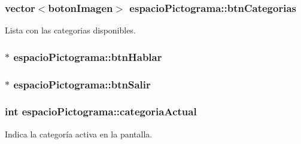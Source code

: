 \subsubsection[{btn\+Categorias}]{\setlength{\rightskip}{0pt plus 5cm}vector$<${\bf boton\+Imagen}$>$ espacio\+Pictograma\+::btn\+Categorias\hspace{0.3cm}{\ttfamily [private]}}\label{classespacio_pictograma_a1bee74237dc5c39e48be1f6773ca854d}


Lista con las categorias disponibles. 

\hypertarget{classespacio_pictograma_a739c7db68be68b07c10fe93b44a5a4d1}{}
\subsubsection[{btn\+Hablar}]{$\ast$ espacio\+Pictograma\+::btn\+Hablar\hspace{0.3cm}{\ttfamily [private]}}\label{classespacio_pictograma_a739c7db68be68b07c10fe93b44a5a4d1}
\hypertarget{classespacio_pictograma_ade5373849fab0cb55bc87bc4293e8c04}{}
\subsubsection[{btn\+Salir}]{$\ast$ espacio\+Pictograma\+::btn\+Salir\hspace{0.3cm}{\ttfamily [private]}}\label{classespacio_pictograma_ade5373849fab0cb55bc87bc4293e8c04}
\hypertarget{classespacio_pictograma_ae61af3d4b032f682e7e686ca0dddbfec}{}
\subsubsection[{categoria\+Actual}]{\setlength{\rightskip}{0pt plus 5cm}int espacio\+Pictograma\+::categoria\+Actual\hspace{0.3cm}{\ttfamily [private]}}\label{classespacio_pictograma_ae61af3d4b032f682e7e686ca0dddbfec}


Indica la categoría activa en la pantalla. 

